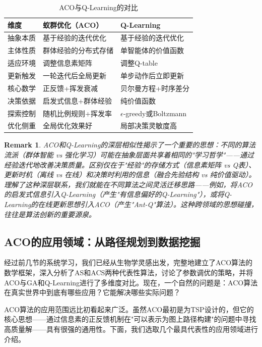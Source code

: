 \documentclass[lang=cn,zihao=-4,a4paper,fontset=windows]{beautybook}
\newtheorem*{remark}{\textbf{Remark}}
\begin{document}
\begin{table}[H]
\centering
\caption{ACO与Q-Learning的对比}
\begin{tabular}{p{}p{}p{}}
\toprule
\textbf{维度} & \textbf{蚁群优化（ACO）} & \textbf{Q-Learning} \\
\midrule
抽象本质 & 基于经验的迭代优化 & 基于经验的迭代优化 \\
\hline
主体性质 & 群体经验的分布式存储 & 单智能体的价值函数 \\
\hline
适应环境 & 调整信息素矩阵 & 调整Q-table \\
\hline
更新触发 & 一轮迭代后全局更新 & 单步动作后立即更新 \\
\hline
核心数学 & 正反馈+挥发衰减 & 贝尔曼方程+时序差分 \\
\hline
决策依据 & 启发式信息+群体经验 & 纯价值函数 \\
\hline
探索控制 & 随机比例规则+挥发率 & $\epsilon$-greedy或Boltzmann \\
\hline
优化侧重 & 全局优化效果好 & 局部决策灵敏度高 \\
\bottomrule
\end{tabular}
\end{table}

\begin{remark}
ACO和Q-Learning的深层相似性揭示了一个重要的思想：不同的算法流派（群体智能 vs 强化学习）可能在抽象层面共享着相同的"学习哲学"——通过经验迭代地改善决策质量。区别仅在于"经验"的存储方式（信息素矩阵 vs Q表）、更新时机（离线 vs 在线）和决策时利用的信息（融合先验结构 vs 纯价值驱动）。理解了这种深层联系，我们就能在不同算法之间灵活迁移思路——例如，将ACO的启发式信息引入Q-Learning（产生"有信息偏好的Q-Learning"），或将Q-Learning的在线更新思想引入ACO（产生"Ant-Q"算法）。这种跨领域的思想碰撞，往往是算法创新的重要源泉。
\end{remark}

\subsection{ACO的应用领域：从路径规划到数据挖掘}

经过前几节的系统学习，我们已经从生物学灵感出发，完整地建立了ACO算法的数学框架，深入分析了AS和ACS两种代表性算法，讨论了参数调优的策略，并将ACO与GA和Q-Learning进行了多维度对比。现在，一个自然的问题是：ACO算法在真实世界中到底有哪些应用？它能解决哪些实际问题？

ACO算法的应用范围远比初看起来广泛。虽然ACO最初是为TSP设计的，但它的核心思想——通过信息素的正反馈机制在"可以表示为图上路径构建"的问题中寻找高质量解——具有很强的通用性。下面，我们选取几个最具代表性的应用领域进行介绍。
\end{document}
